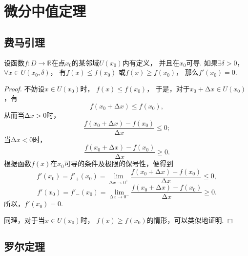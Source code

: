 \section{微分中值定理}
\subsection{费马引理}
\begin{lemma}[费马引理]\label{theorem:微分中值定理.费马引理}
设函数\(f\colon D\to\mathbb{R}\)在点\(x_0\)的某邻域\(U(x_0)\)内有定义，
并且在\(x_0\)可导.
如果\(\exists\delta>0\)，
\(\forall x \in U(x_0,\delta)\)，
有\(f(x) \leq f(x_0)\)
或\(f(x) \geq f(x_0)\)，
那么\(f'(x_0) = 0\).
\begin{proof}
不妨设\(x \in U(x_0)\)时，
\(f(x) \leq f(x_0)\)，
于是，对于\(x_0 + \increment x \in U(x_0)\)，有\[
    f(x_0 + \increment x) \leq f(x_0),
\]
从而当\(\increment x > 0\)时，\[
    \frac{f(x_0 + \increment x) - f(x_0)}{\increment x} \leq 0;
\]
当\(\increment x < 0\)时，\[
    \frac{f(x_0 + \increment x) - f(x_0)}{\increment x} \geq 0.
\]
根据函数\(f(x)\)在\(x_0\)可导的条件及极限的保号性，便得到\[
    f'(x_0) = f'_+(x_0)
    = \lim_{\increment x\to0^+}
    \frac{f(x_0 + \increment x) - f(x_0)}{\increment x} \leq 0,
\]\[
    f'(x_0) = f'_-(x_0)
    = \lim_{\increment x\to0^-}
    \frac{f(x_0 + \increment x) - f(x_0)}{\increment x} \geq 0.
\]
所以，\(f'(x_0) = 0\).

同理，对于当\(x \in U(x_0)\)时，
\(f(x) \geq f(x_0)\)的情形，可以类似地证明.
\end{proof}
\end{lemma}

\subsection{罗尔定理}
\begin{figure}[htb]
	\centering
	\caption{}
	\label{figure:微分中值定理.罗尔定理的几何意义}
\end{figure}

